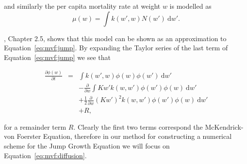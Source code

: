 \documentclass[../main.tex]{subfiles}
\begin{document}
  and similarly the per capita mortality rate at weight $w$ is modelled as
  \begin{equation}
    \mu(w) = \int k(w', w) N(w') \: \mathrm{d}w'.
  \end{equation}

  \cite{datta2010}, Chapter 2.5, shows that this model can be shown as an approximation to Equation~\ref{eq:mvf:jump}. By expanding the Taylor series of the last term of Equation~\ref{eq:mvf:jump} we see that

  \begin{eqnarray}\label{eq:mvf:diffusion}
    \frac{\partial \phi(w)}{\partial t}
    &=& \int k(w', w) \phi(w)\phi(w') \: \mathrm{d}w' \nonumber \\
    && - \frac{\partial}{\partial w} \int K w' k(w, w')\phi(w')\phi(w) \: \mathrm{d}w' \nonumber \\
    && + \frac{1}{2} \frac{\partial}{\partial w} (K w')^2 k(w, w')\phi(w')\phi(w)  \: \mathrm{d}w' \nonumber \\
    && + R,
  \end{eqnarray}

  for a remainder term $R$. Clearly the first two terms correspond the McKendrick-von Foerster Equation, therefore in our method for constructing a numerical scheme for the Jump Growth Equation we will focus on Equation~\ref{eq:mvf:diffusion}.
\end{document}
